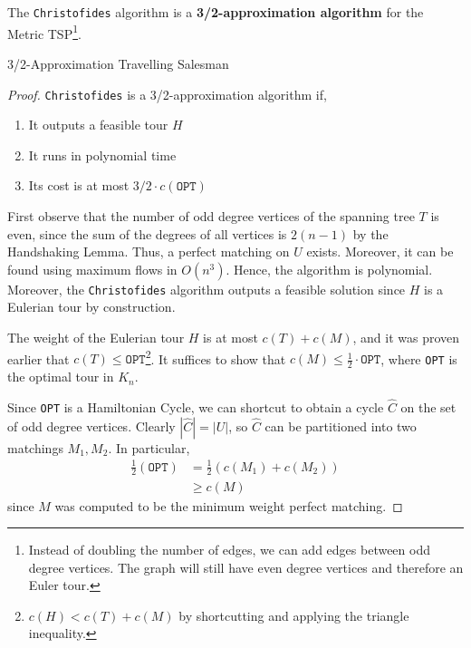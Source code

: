 \begin{thm}
	The \texttt{Christofides} algorithm is a \textbf{3/2-approximation algorithm} for the Metric TSP\footnote{Instead of doubling the number of edges, we can add edges between odd degree vertices. The graph will still have even degree vertices and therefore an Euler tour.}.
	\begin{algorithm}
	  \caption{3/2-Approximation Travelling Salesman}\label{23approxTSP}
	\end{algorithm}
\end{thm}

\begin{proof}
	\texttt{Christofides} is a 3/2-approximation algorithm if,
	\begin{enumerate}
		\item It outputs a feasible tour $H$
		\item It runs in polynomial time
		\item Its cost is at most $3/2 \cdot c(\texttt{OPT})$
	\end{enumerate}

	\noindent First observe that the number of odd degree vertices of the spanning tree $T$ is even, since the sum of the degrees of all vertices is $2(n-1)$ by the Handshaking Lemma. Thus, a perfect matching on $U$ exists. Moreover, it can be found using maximum flows in $O(n^3)$. Hence, the algorithm is polynomial. Moreover, the \texttt{Christofides} algorithm outputs a feasible solution since $H$ is a Eulerian tour by construction.

	The weight of the Eulerian tour $H$ is at most $c(T) + c(M)$, and it was proven earlier that $c(T) \leq \texttt{OPT}$\footnote{$c(H) < c(T) + c(M)$ by shortcutting and applying the triangle inequality.}. It suffices to show that $c(M) \leq \frac{1}{2} \cdot \texttt{OPT}$, where \texttt{OPT} is the optimal tour in $K_n$.

	Since \texttt{OPT} is a Hamiltonian Cycle, we can shortcut to obtain a cycle $\hat{C}$ on the set of odd degree vertices. Clearly $|\hat{C}| = |U|$, so $\hat{C}$ can be partitioned into two matchings $M_1, M_2$. In particular,
	\begin{align*}
		\frac{1}{2}\left(\texttt{OPT} \right) &= \frac{1}{2}\left(c(M_1) + c(M_2)\right) \\
											  &\geq c(M)
	\end{align*}
	\noindent since $M$ was computed to be the minimum weight perfect matching.
\end{proof}

